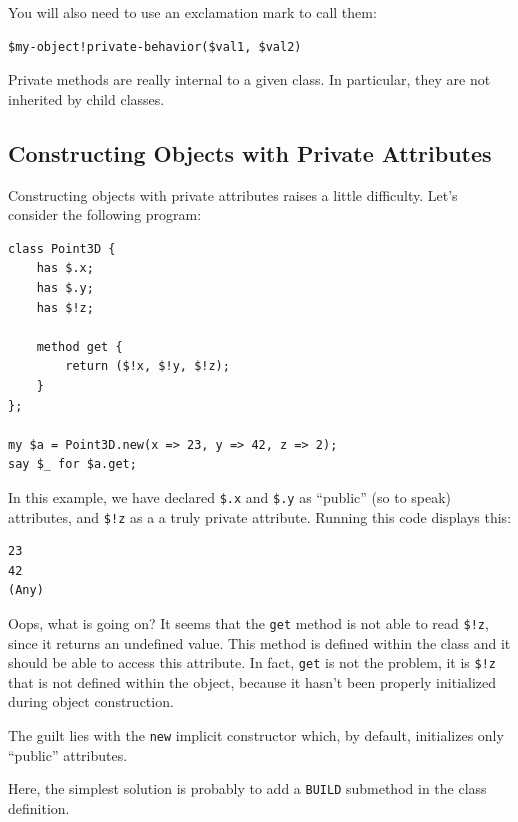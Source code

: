 You will also need to use an exclamation mark to call them:

\begin{verbatim}
$my-object!private-behavior($val1, $val2)
\end{verbatim}

Private methods are really internal to a given class. In 
particular, they are not inherited by child classes.


\subsection{Constructing Objects with Private Attributes}

Constructing objects with private attributes raises a 
little difficulty. Let's consider the following program:

\begin{verbatim}
class Point3D {
    has $.x;
    has $.y;
    has $!z;
    
    method get {
        return ($!x, $!y, $!z);
    }
};

my $a = Point3D.new(x => 23, y => 42, z => 2);
say $_ for $a.get;
\end{verbatim}

In this example, we have declared \verb'$.x' and \verb'$.y' 
as ``public'' (so to speak) attributes, and \verb'$!z' as a
a truly private attribute. Running this code displays this:

\begin{verbatim}
23
42
(Any)
\end{verbatim}

Oops, what is going on? It seems that the {\tt get} 
method is not able to read \verb'$!z', since it returns 
an undefined value. This method is defined within the 
class and it should be able to access this attribute. In 
fact, {\tt get} is not the problem, it is \verb'$!z' that is 
not defined within the object, because it hasn't been properly 
initialized during object construction.

The guilt lies with the {\tt new} implicit constructor which, 
by default, initializes only ``public'' attributes.

Here, the simplest solution is probably to add a {\tt BUILD} 
submethod in the class definition.


